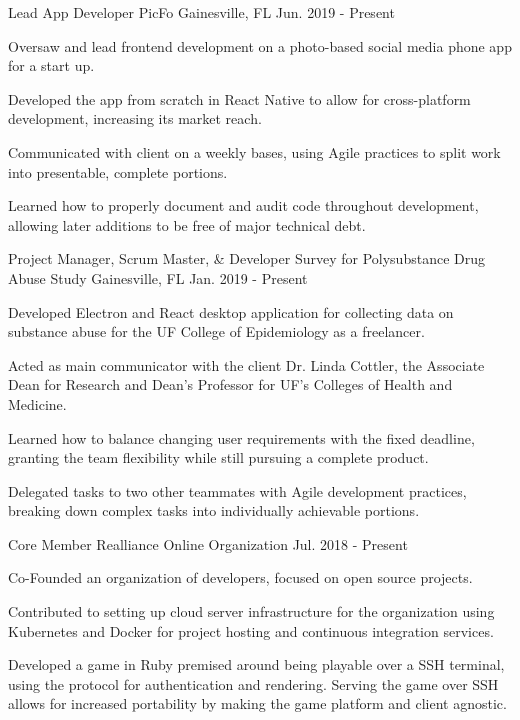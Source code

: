 \begin{cventries}
  \cventry
  {Lead App Developer}
  {PicFo}
  {Gainesville, FL}
  {Jun. 2019 - Present}
  {
    \begin{cvitems}
      \item {Oversaw and lead frontend development on a photo-based social media phone app for a start up.}
      \item {Developed the app from scratch in React Native to allow for cross-platform development, increasing its market reach.}
      \item {Communicated with client on a weekly bases, using Agile practices to split work into presentable, complete portions.}
      \item {Learned how to properly document and audit code throughout development, allowing later additions to be free of major technical debt.}
    \end{cvitems}
  }
  \cventry
    {Project Manager, Scrum Master, \& Developer}
    {Survey for Polysubstance Drug Abuse Study}
    {Gainesville, FL}
    {Jan. 2019 - Present}
    {
      \begin{cvitems}
        \item {Developed Electron and React desktop application for collecting data on substance abuse for the UF College of Epidemiology as a freelancer.}
        \item {Acted as main communicator with the client Dr. Linda Cottler, the Associate Dean for Research and Dean's Professor for UF's Colleges of Health and Medicine.}
        \item {Learned how to balance changing user requirements with the fixed deadline, granting the team flexibility while still pursuing a complete product.}
        \item {Delegated tasks to two other teammates with Agile development practices, breaking down complex tasks into individually achievable portions.}
      \end{cvitems}
    }
  \cventry
    {Core Member}
    {Realliance}
    {Online Organization}
    {Jul. 2018 - Present}
    {
      \begin{cvitems}
        \item {Co-Founded an organization of developers, focused on open source projects.}
        \item {Contributed to setting up cloud server infrastructure for the organization using Kubernetes and Docker for project hosting and continuous integration services.}
        \item {Developed a game in Ruby premised around being playable over a SSH terminal, using the protocol for authentication and rendering. Serving the game over SSH allows for increased portability by making the game platform and client agnostic.}
      \end{cvitems}
    }
\end{cventries}
